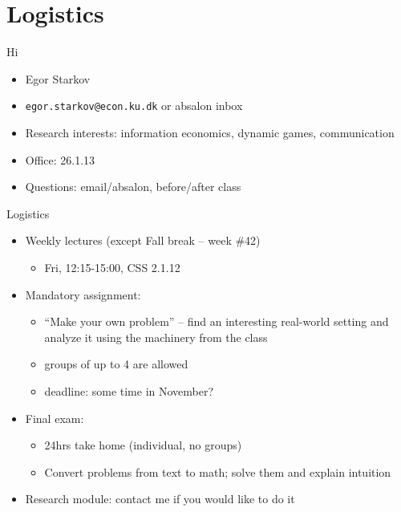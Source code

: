 \documentclass[english,10pt
,aspectratio=169
]{beamer}
\begin{document}
\section{Logistics}

\begin{frame}{Hi}
\begin{itemize}
	\item Egor Starkov
	\item \texttt{egor.starkov@econ.ku.dk} or absalon inbox
	\item Research interests: information economics, dynamic games, communication
	\item Office: 26.1.13
	\item Questions: email/absalon, before/after class
\end{itemize}
\end{frame}


\begin{frame}{Logistics}
\begin{itemize}
	\item Weekly lectures (except Fall break -- week \#42)
	\begin{itemize}
		\item Fri, 12:15-15:00, CSS 2.1.12
	\end{itemize}
	
	\pause
	\item Mandatory assignment:
	\begin{itemize}
		\item ``Make your own problem'' -- find an interesting real-world setting and analyze it using the machinery from the class
		\item groups of up to 4 are allowed
		\item deadline: some time in November?
	\end{itemize}
	
	\pause
	\item Final exam:
	\begin{itemize}
		\item 24hrs take home (individual, no groups)
		\item Convert problems from text to math; solve them and explain intuition
	\end{itemize}

	\pause
	\item Research module: contact me if you would like to do it
\end{itemize}
\end{frame}
\end{document}
